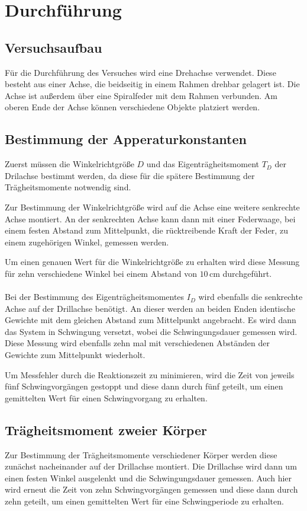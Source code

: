 \section{Durchführung}
\label{sec:Durchführung}

\subsection{Versuchsaufbau}
Für die Durchführung des Versuches wird eine Drehachse verwendet. Diese besteht aus einer Achse, die beidseitig in einem Rahmen drehbar gelagert ist. Die Achse ist außerdem über eine Spiralfeder
mit dem Rahmen verbunden. Am oberen Ende der Achse können verschiedene Objekte platziert werden.

\subsection{Bestimmung der Apperaturkonstanten}
Zuerst müssen die Winkelrichtgröße $D$ und das Eigenträgheitsmoment $ T_D $ der Drilachse bestimmt werden, da diese für die spätere Bestimmung der Trägheitsmomente notwendig sind.

Zur Bestimmung der Winkelrichtgröße wird auf die Achse eine weitere senkrechte Achse montiert. An der senkrechten Achse kann dann mit einer Federwaage, bei einem festen Abstand zum Mittelpunkt,
die rücktreibende Kraft der Feder, zu einem zugehörigen Winkel, gemessen werden.

Um einen genauen Wert für die Winkelrichtgröße zu erhalten wird diese Messung für zehn verschiedene Winkel bei einem
Abstand von $10 \,\si{\centi\meter}$ durchgeführt.
\\
\\
Bei der Bestimmung des Eigenträgheitsmomentes $ I_D $ wird ebenfalls die senkrechte Achse auf der Drillachse benötigt. An dieser werden an beiden Enden identische Gewichte mit dem gleichen Abstand
zum Mittelpunkt angebracht. Es wird dann das System in Schwingung versetzt, wobei die Schwingungsdauer gemessen wird. Diese Messung wird ebenfalls zehn mal mit verschiedenen Abständen der Gewichte
zum Mittelpunkt wiederholt.

Um Messfehler durch die Reaktionszeit zu minimieren, wird die Zeit von jeweils fünf Schwingvorgängen gestoppt und diese dann durch fünf geteilt, um einen gemittelten
Wert für einen Schwingvorgang zu erhalten.

\subsection{Trägheitsmoment zweier Körper}
Zur Bestimmung der Trägheitsmomente verschiedener Körper werden diese zunächst nacheinander auf der Drillachse montiert. Die Drillachse wird dann um einen festen Winkel ausgelenkt und die
Schwingungsdauer gemessen. Auch hier wird erneut die Zeit von zehn Schwingvorgängen gemessen und diese dann durch zehn geteilt, um einen gemittelten Wert für eine Schwingperiode zu erhalten.

